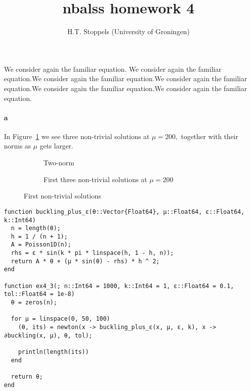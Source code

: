 \documentclass[a4paper]{article}
\author{H.T. Stoppels (University of Groningen)}
\title{{\sc nbalss} homework 4}
\begin{document}
  \maketitle 

  We consider again the familiar equation. We consider again the familiar equation.We consider again the familiar equation.We consider again the familiar equation.We consider again the familiar equation.We consider again the familiar equation.

  \paragraph{a} In Figure~\ref{fig:solutions} we see three non-trivial solutions at $\mu = 200,$ together with their norms as $\mu$ gets larger.


  \begin{figure}[h]
    \begin{subfigure}[b]{0.5\textwidth}
      
      \caption{Two-norm}
    \end{subfigure}
    \begin{subfigure}[b]{0.5\textwidth}
      
      \caption{First three non-trivial solutions at $\mu = 200$}
    \end{subfigure}
    \caption{First non-trivial solutions}
    \label{fig:solutions}
  \end{figure}

  \newpage
  \begin{verbatim}
function buckling_plus_ɛ(θ::Vector{Float64}, μ::Float64, ɛ::Float64, k::Int64)
  n = length(θ);
  h = 1 / (n + 1);
  A = Poisson1D(n);
  rhs = ɛ * sin(k * pi * linspace(h, 1 - h, n));
  return A * θ + (μ * sin(θ) - rhs) * h ^ 2;
end

function ex4_3(; n::Int64 = 1000, k::Int64 = 1, ɛ::Float64 = 0.1, tol::Float64 = 1e-8)
  θ = zeros(n);

  for μ = linspace(0, 50, 100)
    (θ, its) = newton(x -> buckling_plus_ɛ(x, μ, ɛ, k), x -> ∂buckling(x, μ), θ, tol);

    println(length(its))
  end

  return θ;
end
  \end{verbatim}
\end{document}
